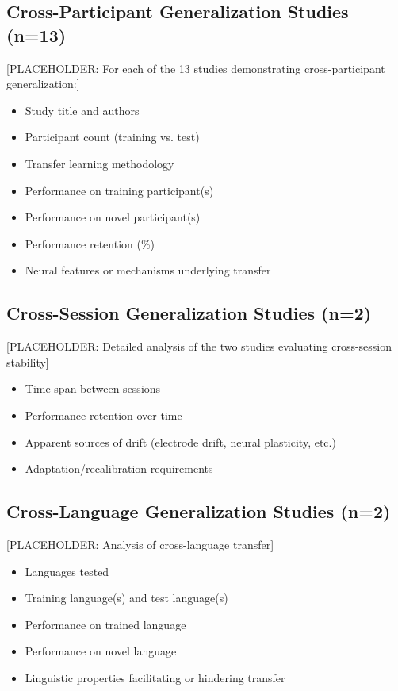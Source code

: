 
\subsection{Cross-Participant Generalization Studies (n=13)}

[PLACEHOLDER: For each of the 13 studies demonstrating cross-participant generalization:]
\begin{itemize}
    \item Study title and authors
    \item Participant count (training vs. test)
    \item Transfer learning methodology
    \item Performance on training participant(s)
    \item Performance on novel participant(s)
    \item Performance retention (\%)
    \item Neural features or mechanisms underlying transfer
\end{itemize}

\subsection{Cross-Session Generalization Studies (n=2)}

[PLACEHOLDER: Detailed analysis of the two studies evaluating cross-session stability]
\begin{itemize}
    \item Time span between sessions
    \item Performance retention over time
    \item Apparent sources of drift (electrode drift, neural plasticity, etc.)
    \item Adaptation/recalibration requirements
\end{itemize}

\subsection{Cross-Language Generalization Studies (n=2)}

[PLACEHOLDER: Analysis of cross-language transfer]
\begin{itemize}
    \item Languages tested
    \item Training language(s) and test language(s)
    \item Performance on trained language
    \item Performance on novel language
    \item Linguistic properties facilitating or hindering transfer
\end{itemize}

